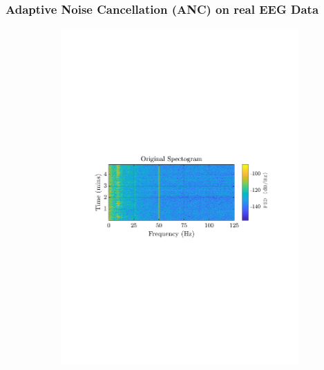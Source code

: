 \documentclass[12pt]{article}
\numberwithin{equation}{section}
\begin{document}
		\subsubsection{Adaptive Noise Cancellation (ANC) on real EEG Data}
			\begin{figure}[H]
				\centering
				\begin{subfigure}{0.49\textwidth}
					\centering
					\includegraphics[trim={2.2cm 11.2cm 2.70cm  11.2cm}, clip, width=\textwidth]{../MATLAB/figures/q2_3d_fig01.pdf} 
					\captionsetup{justification=centering}
				\end{subfigure}
				\begin{subfigure}{0.49\textwidth}
					\centering

\end{subfigure}
\end{figure}
\end{document}
